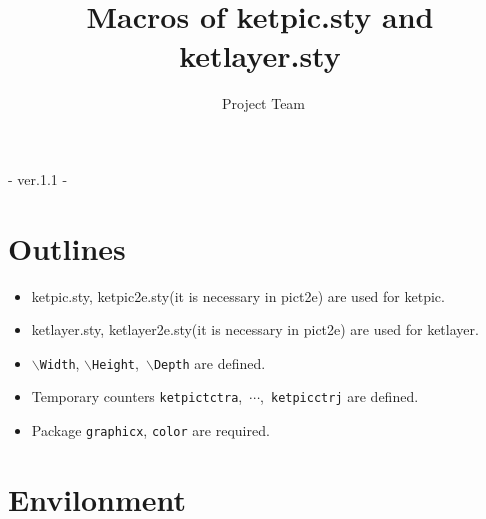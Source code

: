 \documentclass[papersize,a4paper,12pt]{article}
\newcommand{\bs}{$\backslash$}
\begin{document}
\title{Macros of ketpic.sty and ketlayer.sty}
\author{\ketcindy\ Project Team}
\maketitle

\begin{center}  - ver.1.1 -\end{center}



\section{Outlines}

\begin{itemize}
\item ketpic.sty, ketpic2e.sty(it is necessary in pict2e) are used for ketpic.
\item ketlayer.sty, ketlayer2e.sty(it is necessary in pict2e) are used for ketlayer.
\item \bs\verb|Width|, \bs\verb|Height|,\ \bs\verb|Depth| are defined.
\item Temporary counters \verb|ketpictctra|,\ $\cdots$,\ \verb|ketpicctrj| are defined.
\item Package \verb|graphicx|, \verb|color| are required.

\end{itemize}


\section{Envilonment}
\end{document}
